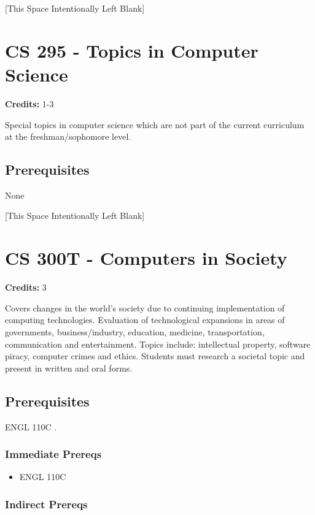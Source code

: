 \documentclass[]{article}
\providecommand{\tightlist}{%
  \setlength{\itemsep}{0pt}\setlength{\parskip}{0pt}}
\newcommand{\pagebreakhere}{
\vspace*{\fill}
\begin{center}
[This Space Intentionally Left Blank]
\end{center}
\vspace*{\fill}
\newpage
}
\begin{document}
\pagebreakhere
\section{CS 295 - Topics in Computer
Science}\label{cs-295---topics-in-computer-science}

\textbf{Credits:} 1-3

Special topics in computer science which are not part of the current
curriculum at the freshman/sophomore level.

\subsection{Prerequisites}\label{prerequisites-11}

None

\pagebreakhere
\section{CS 300T - Computers in
Society}\label{cs-300t---computers-in-society}

\textbf{Credits:} 3

Covers changes in the world's society due to continuing implementation
of computing technologies. Evaluation of technological expansions in
areas of governments, business/industry, education, medicine,
transportation, communication and entertainment. Topics include:
intellectual property, software piracy, computer crimes and ethics.
Students must research a societal topic and present in written and oral
forms.

\subsection{Prerequisites}\label{prerequisites-12}

ENGL 110C .

\subsubsection{Immediate Prereqs}\label{immediate-prereqs-7}

\begin{itemize}
\tightlist
\item
  ENGL 110C
\end{itemize}

\subsubsection{Indirect Prereqs}\label{indirect-prereqs-7}
\end{document}
